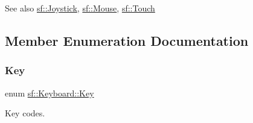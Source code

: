 \begin{DoxySeeAlso}{See also}
\mbox{\hyperlink{classsf_1_1_joystick}{sf\+::\+Joystick}}, \mbox{\hyperlink{classsf_1_1_mouse}{sf\+::\+Mouse}}, \mbox{\hyperlink{classsf_1_1_touch}{sf\+::\+Touch}} \begin{DoxyVerb}\end{DoxyVerb}
 
\end{DoxySeeAlso}


\subsection{Member Enumeration Documentation}
\mbox{\label{classsf_1_1_keyboard_acb4cacd7cc5802dec45724cf3314a142}} 
\subsubsection{\texorpdfstring{Key}{Key}}
{\footnotesize\ttfamily enum \mbox{\hyperlink{classsf_1_1_keyboard_acb4cacd7cc5802dec45724cf3314a142}{sf\+::\+Keyboard\+::\+Key}}}



Key codes. 

